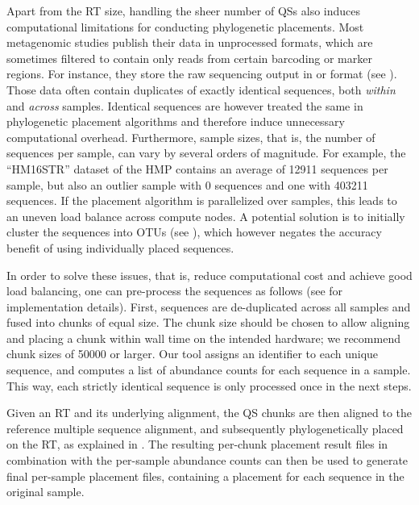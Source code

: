 Apart from the \ac{RT} size, handling the sheer number of \acp{QS}
also induces computational limitations for conducting phylogenetic placements.
Most metagenomic studies publish their data in unprocessed formats,
which are sometimes filtered to contain only reads from certain barcoding or marker regions.
For instance, they store the raw sequencing output in  \citep{Pearson1988}
or  \citep{Cock2009} format (see ).
Those data often contain duplicates of exactly identical sequences, both {\em within} and {\em across} samples.
Identical sequences are however treated the same in phylogenetic placement algorithms
and therefore induce unnecessary computational overhead.
Furthermore, sample sizes, that is, the number of sequences per sample, can vary by several orders of magnitude.
For example, the ``HM16STR'' dataset of the \ac{HMP} \citep{Huttenhower2012,Methe2012}
contains an average of \num{12 911} sequences per sample,
but also an outlier sample with \num{0} sequences and one with \num{403 211} sequences.
If the placement algorithm is parallelized over samples, this leads to an uneven load balance across compute nodes.
A potential solution is to initially cluster the sequences into OTUs
(see ),
which however negates the accuracy benefit of using individually placed sequences.

In order to solve these issues, that is, reduce computational cost and achieve good load balancing,
one can pre-process the sequences as follows (see  for implementation details).
First, sequences are de-duplicated across all samples and fused into chunks of equal size.
The chunk size should be chosen to allow aligning and placing a chunk within wall time on the intended hardware;
we recommend chunk sizes of \num{50 000} or larger.
Our tool assigns an identifier to each unique sequence, and
computes a list of abundance counts for each sequence in a sample.
This way, each strictly identical sequence is only processed once in the next steps.

Given an \ac{RT} and its underlying alignment,
the \ac{QS} chunks are then aligned to the reference multiple sequence alignment,
and subsequently phylogenetically placed on the \ac{RT},
as explained in .
The resulting per-chunk placement result files in combination with the per-sample abundance counts
can then be used to generate final per-sample placement files,
containing a placement for each sequence in the original sample.

